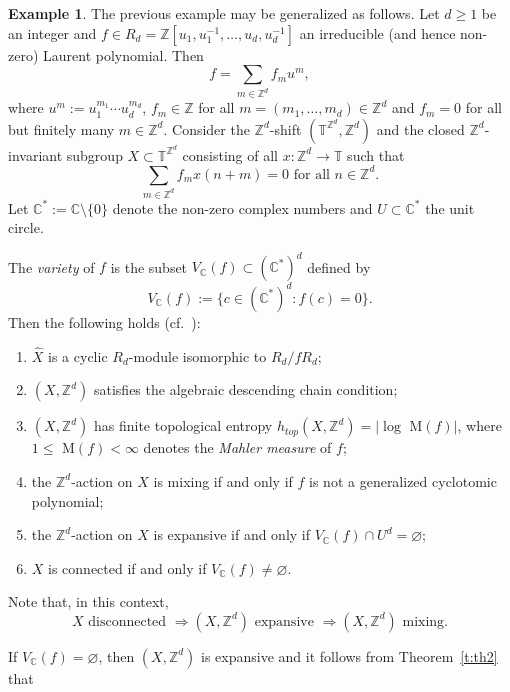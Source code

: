 \documentclass[12pt,a4paper]{amsart}
\theoremstyle{definition}
\newtheorem{example}[theorem]{Example}
\numberwithin{equation}{section}
\begin{document}
\begin{example}
\label{ex:ledrappier-generalized}
The previous example may be generalized as follows.
Let $d \geq 1$ be an  integer and $f \in R_d = {\mathbb{Z}}[u_1,u_1^{-1}, \ldots, u_d,u_d^{-1}]$ an irreducible
(and hence non-zero) 
Laurent polynomial. Then
\[
f = \sum_{m \in {\mathbb{Z}}^d} f_m u^m,
\]
where $u^m := u_1^{m_1}\cdots u_d^{m_d}$, $f_m \in {\mathbb{Z}}$ for all
$m = (m_1,  \ldots, m_d) \in {\mathbb{Z}}^d$ and $f_m = 0$ for all but finitely many $m \in {\mathbb{Z}}^d$.
Consider the ${\mathbb{Z}}^d$-shift $({\mathbb{T}}^{{\mathbb{Z}}^d}, {\mathbb{Z}}^d)$ and the closed ${\mathbb{Z}}^d$-invariant subgroup $X \subset {\mathbb{T}}^{{\mathbb{Z}}^d}$
consisting of all $x \colon {\mathbb{Z}}^d \to {\mathbb{T}}$ such that
\[
\sum_{m \in {\mathbb{Z}}^d} {f_m } x(n+m) = 0 \mbox{ for all } n \in {\mathbb{Z}}^d.
\]
Let ${\mathbb{C}}^* := {\mathbb{C}} \setminus \{0\}$ denote the non-zero  complex numbers and
$U \subset {\mathbb{C}}^*$ the unit circle.
\par
The \emph{variety} of $f$ is the subset $V_{\mathbb{C}}(f) \subset ({\mathbb{C}}^*)^d$ defined by
\[
V_{\mathbb{C}}(f) := \{c \in ({\mathbb{C}}^*)^d: f(c) = 0\}.
\]
Then the following holds (cf.\  \cite[Theorem 6.5 and Theorem 18.1]{schmidt-book}):
\begin{enumerate}[{\rm (1)}]
\item $\widehat{X}$ is a cyclic $R_d$-module isomorphic to $R_d/fR_d$;
\item $(X, {\mathbb{Z}}^d)$ satisfies the algebraic descending chain condition;
\item $(X, {\mathbb{Z}}^d)$ has finite topological entropy $h_{top}(X ,{\mathbb{Z}}^d) = \vert \log$\! M$(f) \vert$,
where $1 \leq $ M$(f) < \infty$ denotes the \emph{Mahler measure} of $f$;
\item the ${\mathbb{Z}}^d$-action on $X$ is mixing if and only if $f$ is not a generalized cyclotomic polynomial;
\item the ${\mathbb{Z}}^d$-action on $X$ is expansive if and only if $V_{\mathbb{C}}(f) \cap U^d = \varnothing$;
\item $X$ is connected if and only if $V_{\mathbb{C}}(f) \neq \varnothing$.
\end{enumerate}
Note that, in this context,
$$
X \text{ disconnected } \Rightarrow (X,{\mathbb{Z}}^d) \text{ expansive } \Rightarrow (X,{\mathbb{Z}}^d) \text{ mixing}. 
$$
\par
If $V_{\mathbb{C}}(f) = \varnothing$, then $(X,{\mathbb{Z}}^d)$ is expansive and
it follows from Theorem~\ref{t:th2} that

\end{example}
\end{document}
